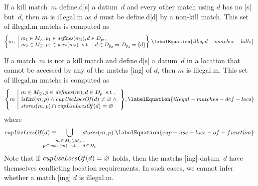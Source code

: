 If a \gls{kill match}~$m$ \gls{define.d}[s] a \gls{datum}~$d$ and every other
\gls{match} using $d$ has no [s] but~$d$, then $m$
is \gls{illegal.m} as $d$ must be \gls{define.d}[d] by a non-\gls{kill match}.
%
This set of \gls{illegal.m} \glspl{match} is computed as
%
\begin{equation}
  \mSetBuilder*{m_1}%
               {%
                 \begin{array}{@{}l@{}}
                   m_1 \in \mKillMatchSet,
                   p_1 \in \mDefines(m_1),
                   d \in \mDataSet[p_1], \\
                   m_2 \in \mKillMatchCompSet,
                   p_2 \in \mUses(m_2) \text{ \st }
                   d \in \mDataSet[p_2] \mImp \mDataSet[p_2] = \mSet{d}
                 \end{array}
               }\!.
  \labelEquation{illegal-matches-kills}
\end{equation}

If a \gls{match}~$m$ is not a \gls{kill match} and \gls{define.d}[s] a
\gls{datum}~$d$ in a \gls{location} that cannot be accessed by any of the
\glspl{match} [ing] of $d$, then $m$ is \gls{illegal.m}.
%
This set of \gls{illegal.m} \glspl{match} is computed as
%
\begin{equation}
  \mSetBuilder*{m}%
               {%
                 \begin{array}{@{}l@{}}
                   m \in \mKillMatchCompSet,
                   p \in \mDefines(m),
                   d \in \mDataSet[p] \hspace{-1pt} \text{ \st} \\
                   \mIsExt(m, p)
                   \mAnd
                   \mCupUseLocsOf(d) \neq \mEmptySet
                   \mAnd \mbox{} \\
                   \mStores(m, p) \cap \mCupUseLocsOf(d) = \mEmptySet
                 \end{array}
               }\!,
  \labelEquation{illegal-matches-def-locs}
\end{equation}
%
where
%
\begin{equation}
  \mCupUseLocsOf(d)
  \equiv
  \hspace{-2.5em}
  \bigcup_{
    \substack{
      m \, \in \, \mMatchSet[d] \setminus \mKillMatchSet, \\
      p \, \in \, \mUses(m)
      \text{ \st } d \, \in \, \mDataSet[p]
    }
  }
    \hspace{-2.5em}
    \mStores(m, p).
  \labelEquation{cup-use-locs-of-function}
\end{equation}
%
Note that if \mbox{$\operatorname{\textrm{\textit{cupUseLocsOf}}}(d) = \varnothing$} holds, then the
\glspl{match} [ing] \gls{datum}~$d$ have themselves conflicting
\gls{location} requirements.
%
In such cases, we cannot infer whether a \gls{match} [ing]
$d$ is \gls{illegal.m}.

